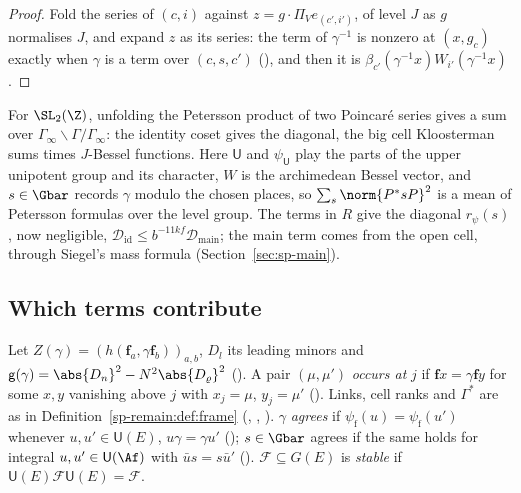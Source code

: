 \begin{proof}
Fold the series of $(c,i)$ against $z=g\cdot\Pi_Ve_{(c',i')}$, of level $J$ as $g$ normalises $J$,
and expand $z$ as its series: the term of $\gamma^{-1}$ is nonzero at $(x,g_c)$ exactly when $\gamma$
is a term over $(c,s,c')$ (), and then
it is $\beta_{c'}(\gamma^{-1}x)W_{i'}(\gamma^{-1}x)$.
\end{proof}

\begin{remark}\label{sp-unfold:rem:petersson}
For $\SL_2(\Z)$, unfolding the Petersson product of two Poincaré series gives a sum over
$\Gamma_\infty\backslash\Gamma/\Gamma_\infty$: the identity coset gives the diagonal, the big cell
Kloosterman sums times $J$-Bessel functions. Here $\mathsf U$ and $\psi_{\mathsf U}$ play the parts of
the upper unipotent group and its character, $W$ is the archimedean Bessel vector, and $s\in\Gbar$
records $\gamma$ modulo the chosen places, so $\sum_s\norm{P^*sP}^2$ is a mean of Petersson formulas
over the level group. The terms in $R$ give the diagonal $r_\psi(s)$, now negligible,
$\mathcal D_{\mathrm{id}}\le b^{-11kf}\mathcal D_{\mathrm{main}}$; the main term comes from the open
cell, through Siegel's mass formula (Section~\ref{sec:sp-main}).
\end{remark}

\subsection{Which terms contribute}\label{sp-unfold:ss:terms}

Let $Z(\gamma)=(h(\mathbf f_a,\gamma\mathbf f_b))_{a,b}$, $D_l$ its leading minors and
$\mathsf g(\gamma)=\abs{D_n}^2-N^2\abs{D_\varrho}^2$ (). A pair
$(\mu,\mu')$ \emph{occurs at} $j$ if $\mathbf fx=\gamma\mathbf fy$ for some $x,y$ vanishing above
$j$ with $x_j=\mu$, $y_j=\mu'$ (). Links, cell ranks and $\Gamma^*$ are as
in Definition~\ref{sp-remain:def:frame} (, ,
). $\gamma$ \emph{agrees} if $\psi_{\mathrm f}(u)=\psi_{\mathrm f}(u')$ whenever
$u,u'\in\mathsf U(E)$, $u\gamma=\gamma u'$ (); $s\in\Gbar$ agrees if the
same holds for integral $u,u'\in\mathsf U(\Af)$ with $\bar us=s\bar u'$ ().
$\mathcal F\subseteq G(E)$ is \emph{stable} if $\mathsf U(E)\mathcal F\mathsf U(E)=\mathcal F$.


